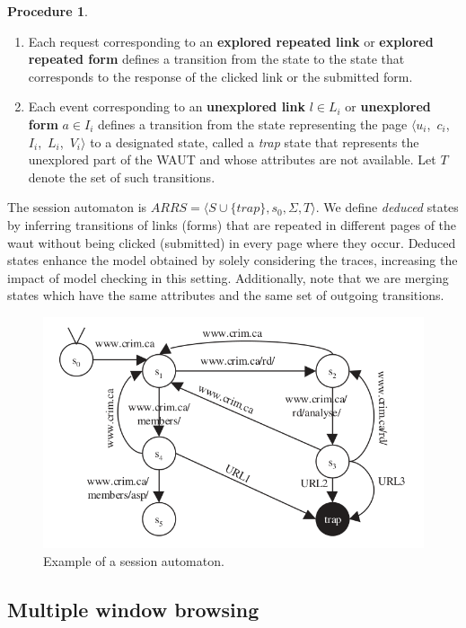 \documentclass[a4paper,10pt]{article}
\newcommand{\res}[1][]{
  \ifthenelse{\equal{#1}{}}{\mbox{$\langle u$, $c$, $I$, $L$, $V\rangle$}}
  {\mbox{$\langle u_{#1}$, $c_{#1}$, $I_{#1}$, $L_{#1}$, $V_{#1}\rangle$}}
}
\theoremstyle{plain} %
\theoremstyle{definition}
\newtheorem{procedure}{Procedure}
\theoremstyle{remark}
\begin{document}
\begin{procedure}
\begin{enumerate}
    \item Each request corresponding to an \textbf{explored repeated link} or \textbf{explored repeated form} defines a transition from the state to the state that corresponds to the response of the clicked link or the submitted form.
    \item Each event corresponding to an \textbf{unexplored link} $l \in L_i$ or \textbf{unexplored form} $a \in I_i$ defines a transition from the state representing the page \res[i] to a designated state, called a \emph{trap} state that represents the unexplored part of the WAUT and whose attributes are not available. Let $T$ denote the set of such transitions.
  \end{enumerate}
\end{procedure}

The session automaton is $ARRS = \langle S \cup \{trap\}, s_0, \Sigma, T \rangle$. We define \emph{deduced} states by inferring transitions of links (forms) that are repeated in different pages of the \gls{waut} without being clicked (submitted) in every page where they occur. Deduced states enhance the model obtained by solely considering the traces, increasing the impact of model checking in this setting. Additionally, note that we are merging states which have the same attributes and the same set of outgoing transitions.

\begin{figure}[h]
  \includegraphics[width=\textwidth]{img/session_automaton_example.png}
  \caption{Example of a session automaton.}
\end{figure}

\subsection{Multiple window browsing}
\label{multiple-window-browsing}
\end{document}
